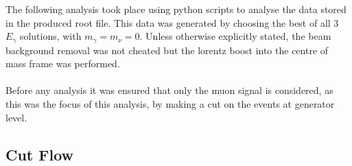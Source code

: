 The following analysis took place using python scripts to analyse the data stored in the produced root file. This data was generated by choosing the best of all 3 ${E}_{\gamma}$ solutions, with  ${m}_{\gamma} = {m}_{\nu} = 0$. Unless otherwise explicitly stated, the beam background removal was not cheated but the lorentz boost into the centre of mass frame was performed.
\\\\
Before any analysis it was ensured that only the muon signal is considered, as this was the focus of this analysis, by making a cut on the events at generator level.

\subsection{Cut Flow}
\label{SUBSEC:CutFlow}

